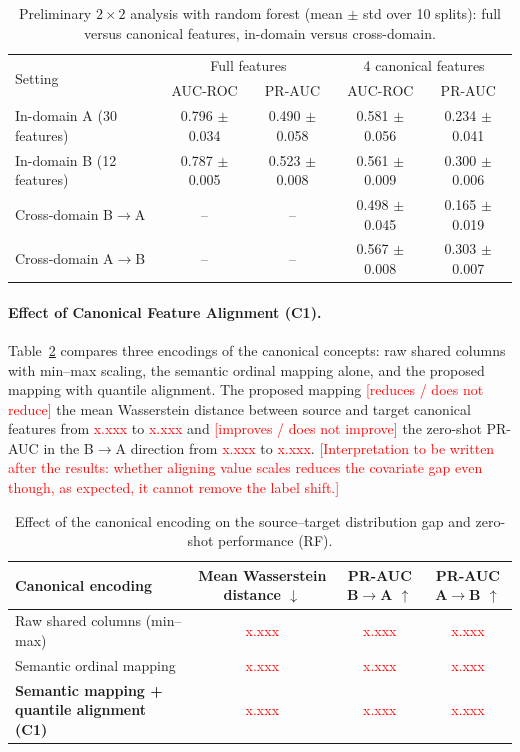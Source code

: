 \documentclass[runningheads]{llncs}
\newcommand{\tbd}[1]{\textcolor{red}{#1}}
\newcommand{\x}{\tbd{x.xxx}}
\begin{document}
\begin{table}[t]
\centering
\caption{Preliminary $2\times2$ analysis with random forest (mean $\pm$ std over 10 splits): full versus canonical features, in-domain versus cross-domain.}\label{tab:gap}
\scriptsize
\setlength{\tabcolsep}{4pt}
\begin{tabular}{@{}lcccc@{}}
\toprule
\multirow{2}{*}{Setting} & \multicolumn{2}{c}{Full features} & \multicolumn{2}{c}{4 canonical features} \\
\cmidrule(lr){2-3}\cmidrule(lr){4-5}
 & AUC-ROC & PR-AUC & AUC-ROC & PR-AUC \\
\midrule
In-domain A (30 features) & 0.796 $\pm$ 0.034 & 0.490 $\pm$ 0.058 & 0.581 $\pm$ 0.056 & 0.234 $\pm$ 0.041 \\
In-domain B (12 features) & 0.787 $\pm$ 0.005 & 0.523 $\pm$ 0.008 & 0.561 $\pm$ 0.009 & 0.300 $\pm$ 0.006 \\
Cross-domain B$\to$A & -- & -- & 0.498 $\pm$ 0.045 & 0.165 $\pm$ 0.019 \\
Cross-domain A$\to$B & -- & -- & 0.567 $\pm$ 0.008 & 0.303 $\pm$ 0.007 \\
\bottomrule
\end{tabular}
\end{table}

\paragraph{Effect of Canonical Feature Alignment (C1).}
Table~\ref{tab:c1} compares three encodings of the canonical concepts: raw shared columns with min--max scaling, the semantic ordinal mapping alone, and the proposed mapping with quantile alignment. The proposed mapping \tbd{[reduces / does not reduce]} the mean Wasserstein distance between source and target canonical features from \x{} to \x{} and \tbd{[improves / does not improve]} the zero-shot PR-AUC in the B$\to$A direction from \x{} to \x{}. \tbd{[Interpretation to be written after the results: whether aligning value scales reduces the covariate gap even though, as expected, it cannot remove the label shift.]}

\begin{table}[t]
\centering
\caption{Effect of the canonical encoding on the source--target distribution gap and zero-shot performance (RF).}\label{tab:c1}
\scriptsize
\setlength{\tabcolsep}{5pt}
\begin{tabular}{@{}lccc@{}}
\toprule
Canonical encoding & \makecell{Mean Wasserstein\\distance $\downarrow$} & \makecell{PR-AUC\\B$\to$A $\uparrow$} & \makecell{PR-AUC\\A$\to$B $\uparrow$} \\
\midrule
Raw shared columns (min--max) & \x & \x & \x \\
Semantic ordinal mapping & \x & \x & \x \\
\textbf{Semantic mapping + quantile alignment (C1)} & \x & \x & \x \\
\bottomrule
\end{tabular}
\end{table}
\end{document}
